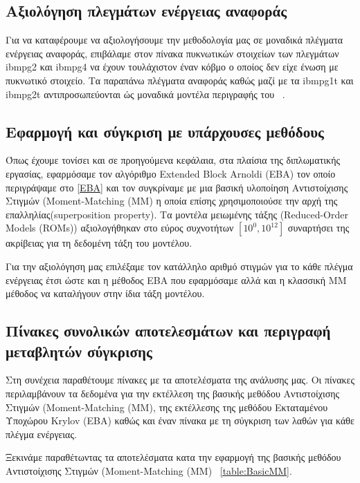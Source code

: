 \subsection{Αξιολόγηση πλεγμάτων ενέργειας αναφοράς}
Για να καταφέρουμε να αξιολογήσουμε την μεθοδολογία μας σε μοναδικά πλέγματα ενέργειας αναφοράς, επιβάλαμε στον πίνακα πυκνωτικών στοιχείων των πλεγμάτων \textlatin{ibmpg2} και \textlatin{ibmpg4} να έχουν τουλάχιστον έναν κόβμο ο οποίος δεν είχε ένωση με πυκνωτικό στοιχείο. Τα παραπάνω πλέγματα αναφοράς καθώς μαζί με τα \textlatin{ibmpg1t} και \textlatin{ibmpg2t} αντιπροσωπεύονται ώς μοναδικά μοντέλα περιγραφής του ~\cite{nassif2008power}. %


\subsection{Εφαρμογή και σύγκριση με υπάρχουσες μεθόδους}
Όπως έχουμε τονίσει και σε προηγούμενα κεφάλαια, στα πλαίσια της διπλωματικής εργασίας, εφαρμόσαμε τον αλγόριθμο \textlatin{Extended Block Arnoldi (EBA)} τον οποίο περιγράψαμε στο \ref{EBA} και τον συγκρίναμε με μια βασική υλοποίηση Αντιστοίχισης Στιγμών (\textlatin{Moment-Matching (MM)} η οποία επίσης χρησιμοποιούσε την αρχή της επαλληλίας(\textlatin{superposition property}). Τα μοντέλα μειωμένης τάξης (\textlatin{Reduced-Order Models (ROMs)}) αξιολογήθηκαν στο εύρος συχνοτήτων $[10^0, 10^{12}]$ συναρτήσει της ακρίβειας για τη δεδομένη τάξη του μοντέλου.

Για την αξιολόγηση μας επιλέξαμε τον κατάλληλο αριθμό στιγμών για το κάθε πλέγμα ενέργειας έτσι ώστε και η μέθοδος \textlatin{EBA} που εφαρμόσαμε αλλά και η κλασσική \textlatin{MM} μέθοδος να καταλήγουν στην ίδια τάξη μοντέλου.


\subsection{Πίνακες συνολικών αποτελεσμάτων και περιγραφή μεταβλητών σύγκρισης}

Στη συνέχεια παραθέτουμε πίνακες με τα αποτελέσματα της ανάλυσης μας. Οι πίνακες περιλαμβάνουν τα δεδομένα για την εκτέλλεση της βασικής μεθόδου Αντιστοίχισης Στιγμών (\textlatin{Moment-Matching (MM)}, της εκτέλλεσης της μεθόδου Εκταταμένου Υποχώρου \textlatin{Krylov} (\textlatin{EBA}) καθώς και έναν πίνακα με τη σύγκριση των λαθών για κάθε πλέγμα ενέργειας.

Ξεκινάμε παραθέτωντας τα αποτελέσματα κατα την εφαρμογή της βασικής μεθόδου Αντιστοίχισης Στιγμών (\textlatin{Moment-Matching (MM)} ~\ref{table:BasicMM}.

